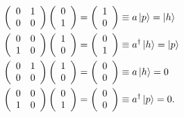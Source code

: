 \documentclass[aps,preprint]{revtex4}%
\begin{document}
\begin{align}
\left(
\begin{array}
[c]{cc}%
0 & 1\\
0 & 0
\end{array}
\right)  \left(
\begin{array}
[c]{c}%
0\\
1
\end{array}
\right)   &  =\left(
\begin{array}
[c]{c}%
1\\
0
\end{array}
\right)  \equiv a\left\vert p\right\rangle =\left\vert h\right\rangle \\
\left(
\begin{array}
[c]{cc}%
0 & 0\\
1 & 0
\end{array}
\right)  \left(
\begin{array}
[c]{c}%
1\\
0
\end{array}
\right)   &  =\left(
\begin{array}
[c]{c}%
0\\
1
\end{array}
\right)  \equiv a^{\dagger}\left\vert h\right\rangle =\left\vert
p\right\rangle \\
\left(
\begin{array}
[c]{cc}%
0 & 1\\
0 & 0
\end{array}
\right)  \left(
\begin{array}
[c]{c}%
1\\
0
\end{array}
\right)   &  =\left(
\begin{array}
[c]{c}%
0\\
0
\end{array}
\right)  \equiv a\left\vert h\right\rangle =0\\
\left(
\begin{array}
[c]{cc}%
0 & 0\\
1 & 0
\end{array}
\right)  \left(
\begin{array}
[c]{c}%
0\\
1
\end{array}
\right)   &  =\left(
\begin{array}
[c]{c}%
0\\
0
\end{array}
\right)  \equiv a^{\dagger}\left\vert p\right\rangle =0.
\end{align}%
\end{document}
